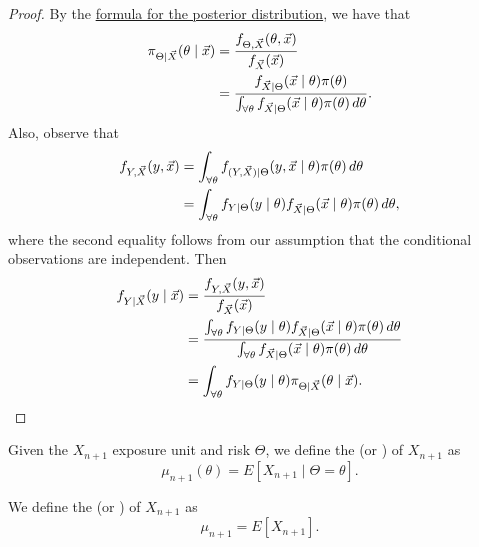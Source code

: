 \documentclass[notoc,notitlepage]{tufte-book}
\begin{document}
\begin{proof}
  By the \hyperref[propo:formula_for_the_posterior_distribution]{formula for the
  posterior distribution}, we have that
  \begin{align*}
    \pi_{\Theta \mid \vec{X}}(\theta \mid \vec{x})
    &= \frac{f_{\Theta, \vec{X}}(\theta, \vec{x})}{f_{\vec{X}}(\vec{x})} \\
    &= \frac{f_{\vec{X} \mid \Theta}(\vec{x} \mid
      \theta)\pi(\theta)}{\int_{\forall \theta} f_{\vec{X} \mid \Theta}(\vec{x}
      \mid \theta) \pi(\theta) \mathop{}\!d{\theta}}.
  \end{align*}
  Also, observe that
  \begin{align*}
    f_{Y, \vec{X}}(y, \vec{x})
    &= \int_{\forall \theta} f_{(Y, \vec{X}) \mid \Theta}(y, \vec{x} \mid
      \theta) \pi(\theta) \mathop{}\!d{\theta} \\
    &= \int_{\forall \theta} f_{Y \mid \Theta}(y \mid \theta) f_{\vec{X} \mid
    \Theta}(\vec{x} \mid \theta) \pi(\theta) \mathop{}\!d{\theta},
  \end{align*}
  where the second equality follows from our assumption that the conditional
  observations are independent. Then
  \begin{align*}
    f_{Y \mid \vec{X}}(y \mid \vec{x})
    &= \frac{f_{Y, \vec{X}}(y, \vec{x})}{f_{\vec{X}}(\vec{x})} \\
    &= \frac{\int_{\forall \theta} f_{Y \mid \Theta}(y \mid \theta) f_{\vec{X}
      \mid \Theta}(\vec{x} \mid \theta) \pi(\theta) \mathop{}\!d{\theta}}{\int_{\forall
      \theta} f_{\vec{X} \mid \Theta}(\vec{x} \mid \theta) \pi(\theta)
      \mathop{}\!d{\theta}} \\
    &= \int_{\forall \theta} f_{Y \mid
      \Theta}(y \mid \theta) \pi_{\Theta \mid \vec{X}}(\theta \mid \vec{x}).
  \end{align*}
\end{proof}

\begin{defn}\label{defn:individual_premium}
  Given the $X_{n+1}$ exposure unit and risk $\Theta$, we define the
   (or ) of $X_{n+1}$ as
  \begin{equation*}
    \mu_{n + 1}(\theta) = E[X_{n+1} \mid \Theta = \theta].
  \end{equation*}
\end{defn}

\begin{defn}\label{defn:pure_premium}
  We define the  (or ) of
  $X_{n+1}$ as
  \begin{equation*}
    \mu_{n + 1} = E[X_{n+1}].
  \end{equation*}
\end{defn}
\end{document}
